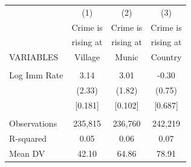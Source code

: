\begin{tabular}{lccc} \hline
 & (1) & (2) & (3) \\
 & Crime is & Crime is & Crime is \\
 & rising at & rising at & rising at \\
VARIABLES & Village & Munic & Country \\ \hline
 &  &  &  \\
Log Imm Rate & 3.14 & 3.01 & -0.30 \\
 & (2.33) & (1.82) & (0.75) \\
 & [0.181] & [0.102] & [0.687] \\
 &  &  &  \\
Observations & 235,815 & 236,760 & 242,219 \\
R-squared & 0.05 & 0.06 & 0.07 \\
 Mean DV & 42.10 & 64.86 & 78.91 \\ \hline
\end{tabular}
